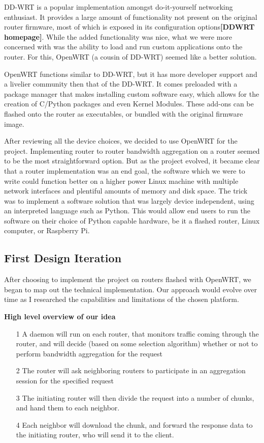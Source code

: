 \documentclass[12pt]{article}
\newcommand{\lcite}[1]
{{\bfseries\color{orange}[#1]}}
\begin{document}
		DD-WRT is a popular implementation amongst do-it-yourself networking enthusiast. It provides a large amount of functionality not present on the original router firmware, most of which is exposed in its configuration options\lcite{DDWRT homepage}. While the added functionality was nice, what we were more concerned with was the ability to load and run custom applications onto the router. For this, OpenWRT (a cousin of DD-WRT) seemed like a better solution. 

		OpenWRT functions similar to DD-WRT, but it has more developer support and a livelier community then that of the DD-WRT. It comes preloaded with a package manager that makes installing custom software easy, which allows for the creation of C/Python packages and even Kernel Modules. These add-ons can be flashed onto the router as executables, or bundled with the original firmware image. 

		After reviewing all the device choices, we decided to use OpenWRT for the project. Implementing router to router bandwidth aggregation on a router seemed to be the most straightforward option. But as the project evolved, it became clear that a router implementation was an end goal, the software which we were to write could function better on a higher power Linux machine with multiple network interfaces and plentiful amounts of memory and disk space. The trick was to implement a software solution that was largely device independent, using an interpreted language such as Python. This would allow end users to run the software on their choice of Python capable hardware, be it a flashed router, Linux computer, or Raspberry Pi.

	\subsection{First Design Iteration}
		
		After choosing to implement the project on routers flashed with OpenWRT, we began to map out the technical implementation. Our approach would evolve over time as I researched the capabilities and limitations of the chosen platform. 

		{\bf High level overview of our idea}
		\begin{itemize}
			\item[1] A daemon will run on each router, that monitors traffic coming through the router, and will decide (based on some selection algorithm) whether or not to perform bandwidth aggregation for the request
			\item[2] The router will ask neighboring routers to participate in an aggregation session for the specified request
			\item[3] The initiating router will then divide the request into a number of chunks, and hand them to each neighbor.
			\item[4] Each neighbor will download the chunk, and forward the response data to the initiating router, who will send it to the client.
		\end{itemize}
\end{document}
